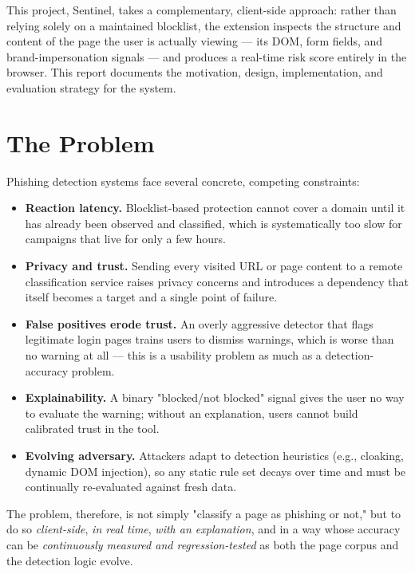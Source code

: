 \documentclass[conference]{IEEEtran}
\begin{document}
This project, Sentinel, takes a complementary, client-side approach: rather than relying solely on a maintained blocklist, the extension inspects the structure and content of the page the user is actually viewing --- its DOM, form fields, and brand-impersonation signals --- and produces a real-time risk score entirely in the browser. This report documents the motivation, design, implementation, and evaluation strategy for the system.

\section{The Problem}
Phishing detection systems face several concrete, competing constraints:

\begin{itemize}
  \item \textbf{Reaction latency.} Blocklist-based protection cannot cover a domain until it has already been observed and classified, which is systematically too slow for campaigns that live for only a few hours.
  \item \textbf{Privacy and trust.} Sending every visited URL or page content to a remote classification service raises privacy concerns and introduces a dependency that itself becomes a target and a single point of failure.
  \item \textbf{False positives erode trust.} An overly aggressive detector that flags legitimate login pages trains users to dismiss warnings, which is worse than no warning at all --- this is a usability problem as much as a detection-accuracy problem.
  \item \textbf{Explainability.} A binary "blocked/not blocked" signal gives the user no way to evaluate the warning; without an explanation, users cannot build calibrated trust in the tool.
  \item \textbf{Evolving adversary.} Attackers adapt to detection heuristics (e.g., cloaking, dynamic DOM injection), so any static rule set decays over time and must be continually re-evaluated against fresh data.
\end{itemize}

The problem, therefore, is not simply "classify a page as phishing or not," but to do so \emph{client-side}, \emph{in real time}, \emph{with an explanation}, and in a way whose accuracy can be \emph{continuously measured and regression-tested} as both the page corpus and the detection logic evolve.
\end{document}
